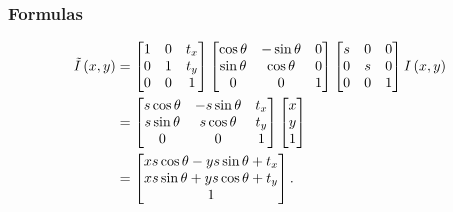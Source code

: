 \subsubsection{Formulas}
\begin{align*}
    \tilde{I}\left (x, y\right) &= 
    \begin{bmatrix}
        1 & 0 & t_x \\
        0 & 1 & t_y \\
        0 & 0 & 1   \\
    \end{bmatrix}
    \begin{bmatrix}
        \cos\theta & -\sin\theta & 0 \\
        \sin\theta & \cos\theta & 0 \\
        0 & 0 & 1   \\
    \end{bmatrix}
    \begin{bmatrix}
        s & 0 & 0 \\
        0 & s & 0 \\
        0 & 0 & 1 \\
    \end{bmatrix} I\left (x,y\right) \\
    &= 
    \begin{bmatrix}
        s\cos\theta & -s\sin\theta & t_x \\
        s\sin\theta & s\cos\theta & t_y \\
        0 & 0 & 1   \\
    \end{bmatrix}
    \begin{bmatrix}
        x \\
        y \\
        1 \\
    \end{bmatrix} \\
    &= \begin{bmatrix}
        xs\cos\theta-ys\sin\theta+t_x \\
        xs\sin\theta+ys\cos\theta+t_y \\
        1 \\
    \end{bmatrix}.
\end{align*}
